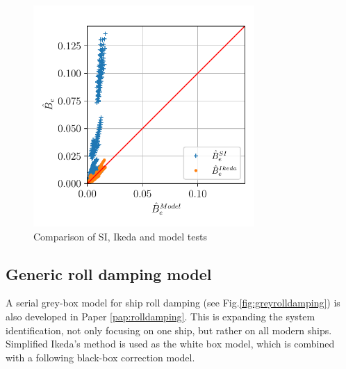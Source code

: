 \begin{figure}[H]

    \includegraphics[width=0.75\textwidth]{kappa/images/si_ikeda_model.pdf}
    \caption{Comparison of SI, Ikeda and model tests}
    \label{fig:si_ikeda_model}

\end{figure}





\subsection{Generic roll damping model}
\label{sec:genericrolldampingmodel}
A serial grey-box model for ship roll damping (see Fig.\ref{fig:greyrolldamping}) is also developed in Paper \ref{pap:rolldamping}. 
This is expanding the system identification, not only focusing on one ship, but rather on all modern ships. 
Simplified Ikeda's method \cite{kawahara_simple_2011} is used as the white box model, which is combined with a following black-box correction model.

